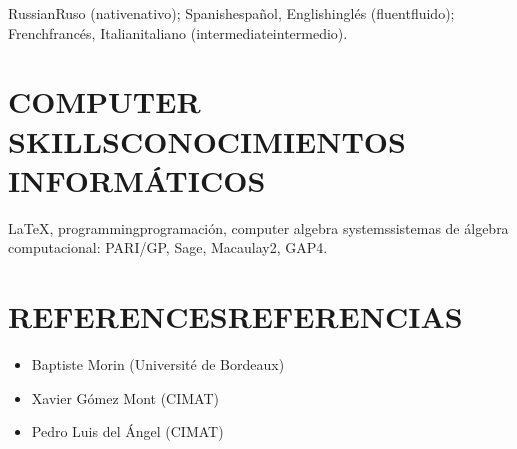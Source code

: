 \documentclass{article}
\newcommand{\biling}[2]{\ifdefined\english#1\fi\ifdefined\spanish#2\fi}
\begin{document}
\biling{Russian}{Ruso} (\biling{native}{nativo});
\biling{Spanish}{español},
\biling{English}{inglés} (\biling{fluent}{fluido});
\biling{French}{francés},
\biling{Italian}{italiano} (\biling{intermediate}{intermedio}).

\vspace{1em}

{\color{RoyalBlue}\section*{\biling{COMPUTER SKILLS}{CONOCIMIENTOS INFORMÁTICOS}}}

LaTeX,
\biling{programming}{programación},
\biling{computer algebra systems}{sistemas de álgebra computacional}:
PARI/GP,
Sage,
Macaulay2,
GAP4.

\vspace{1em}

{\color{RoyalBlue}\section*{\biling{REFERENCES}{REFERENCIAS}}}

\begin{itemize}
\item Baptiste Morin (Université de Bordeaux)
\item Xavier Gómez Mont (CIMAT)
\item Pedro Luis del Ángel (CIMAT)
\end{itemize}
\end{document}
